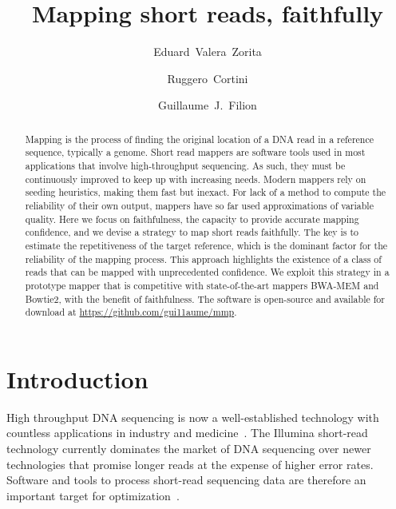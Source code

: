 \documentclass[english]{article}
\begin{document}
\title{Mapping short reads, faithfully}

\author[1]{Eduard~Valera~Zorita}
\author[1]{Ruggero~Cortini}
\author[1,2,3,*]{Guillaume~J.~Filion}


\maketitle

\begin{abstract}
Mapping is the process of finding the original location of a DNA read in a
reference sequence, typically a genome. Short read mappers are software
tools used in most applications that involve high-throughput sequencing.
As such, they must be continuously improved to keep up with increasing
needs. Modern mappers rely on seeding heuristics, making them fast but
inexact. For lack of a method to compute the reliability of their own
output, mappers have so far used approximations of variable quality. Here
we focus on faithfulness, the capacity to provide accurate mapping
confidence, and we devise a strategy to map short reads faithfully. The
key is to estimate the repetitiveness of the target reference, which is
the dominant factor for the reliability of the mapping process. This
approach highlights the existence of a class of reads that can be mapped
with unprecedented confidence. We exploit this strategy in a prototype
mapper that is competitive with state-of-the-art mappers BWA-MEM and
Bowtie2, with the benefit of faithfulness. The software is open-source and
available for download at
\url{https://github.com/gui11aume/mmp}.
\end{abstract}


\section{Introduction}

High throughput DNA sequencing is now a well-established technology with
countless applications in industry and medicine~\cite{pmid30084865}. The
Illumina short-read technology currently dominates the market of DNA
sequencing over newer technologies that promise longer reads at the
expense of higher error rates. Software and tools to process short-read
sequencing data are therefore an important target for
optimization~\cite{Wikillu}.
\end{document}
